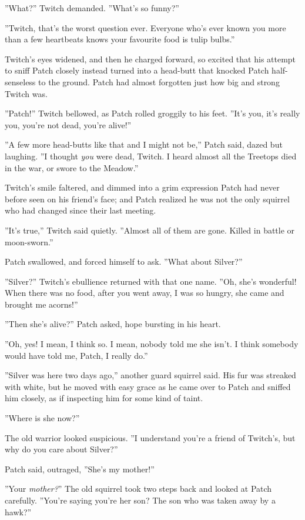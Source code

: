 \documentclass[11pt]{article}
\begin{document}
 ''What?'' Twitch demanded. ''What's so funny?''\par
 ''Twitch, that's the worst question ever. Everyone who's ever known you more than a few heartbeats knows your favourite food is tulip bulbs.''\par
 Twitch's eyes widened, and then he charged forward, so excited that his attempt to sniff Patch closely instead turned into a head-butt that knocked Patch half-senseless to the ground. Patch had almost forgotten just how big and strong Twitch was.\par
 ''Patch!'' Twitch bellowed, as Patch rolled groggily to his feet. ''It's you, it's really you, you're not dead, you're alive!''\par
 ''A few more head-butts like that and I might not be,'' Patch said, dazed but laughing. ''I thought {\it you} were dead, Twitch. I heard almost all the Treetops died in the war, or swore to the Meadow.''\par
 Twitch's smile faltered, and dimmed into a grim expression Patch had never before seen on his friend's face; and Patch realized he was not the only squirrel who had changed since their last meeting.\par
 ''It's true,'' Twitch said quietly. ''Almost all of them are gone. Killed in battle or moon-sworn.''\par
 Patch swallowed, and forced himself to ask. ''What about Silver?''\par
 ''Silver?'' Twitch's ebullience returned with that one name. ''Oh, she's wonderful! When there was no food, after you went away, I was so hungry, she came and brought me acorns!''\par
 ''Then she's alive?'' Patch asked, hope bursting in his heart.\par
 ''Oh, yes! I mean, I think so. I mean, nobody told me she isn't. I think somebody would have told me, Patch, I really do.''\par
 ''Silver was here two days ago,'' another guard squirrel said. His fur was streaked with white, but he moved with easy grace as he came over to Patch and sniffed him closely, as if inspecting him for some kind of taint.\par
 ''Where is she now?''\par
 The old warrior looked suspicious. ''I understand you're a friend of Twitch's, but why do you care about Silver?''\par
 Patch said, outraged, ''She's my mother!''\par
 ''Your {\it mother?}'' The old squirrel took two steps back and looked at Patch carefully. ''You're saying you're her son? The son who was taken away by a hawk?''\par
\end{document}
